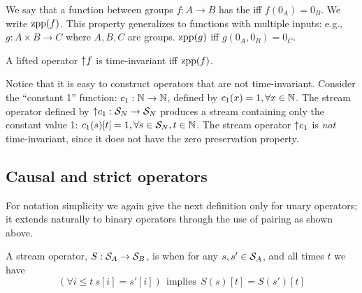 \begin{definition}
We say that a function between groups $f: A \to B$ has the  iff $f(0_A) = 0_B$.  We write $\mbox{zpp}(f)$.  This property generalizes to functions
with multiple inputs: e.g., $g: A \times B \to C$ where $A, B, C$ are groups.  $\mbox{zpp}(g)$
iff $g(0_A, 0_B) = 0_C$.
\end{definition}

\begin{proposition}
A lifted operator ${\uparrow}f$ is time-invariant iff $\mbox{zpp}(f)$.
\end{proposition}

Notice that it is easy to construct operators that are not time-invariant.
Consider the ``constant 1'' function: $c_1: \mathbb{N} \rightarrow \mathbb{N}$, defined by
$c_1(x) = 1, \forall x \in \mathbb{N}$.
The stream operator defined by ${\uparrow}c_1: \mathcal{S}_{N} \rightarrow \mathcal{S}_{N}$
produces a stream containing only the constant value 1: $c_1(s)[t] = 1,
\forall s \in \mathcal{S}_{N}, t \in \mathbb{N}$.  The stream operator ${\uparrow}c_1$
is \emph{not} time-invariant, since it does not have the zero preservation property.

\begin{comment}
\begin{definition}
We call an operator $o: \stream{A} \rightarrow \stream{B}$ over streams
\defined{memoryless} if it can be produced by lifting a function pointwise, i.e.,
there exists a function $f: A \rightarrow B$ such that
$\forall s \in \stream{A} . o(s)[t] = f(s[t])$.

\begin{example}
Whatever definition we give to ``memoryless'' it should be the case that
any memoryless operator is causal.
\end{example}
\end{definition}
\end{comment}

\subsection{Causal and strict operators}\label{sec:causal}

For notation simplicity we again give the next definition only for unary operators;
it extends naturally to binary operators through the use of pairing as shown above.

\begin{definition}[Causality]
A stream operator, $S:\mathcal{S}_{A}\to\mathcal{S}_{B}$,
is  when for any $s,s'\in\mathcal{S}_{A}$,
and all times $t$ we have
$$
(\forall i\leq t~s[i]=s'[i]) ~~\text{implies}~~ S(s)[t]=S(s')[t]
$$
\end{definition}


